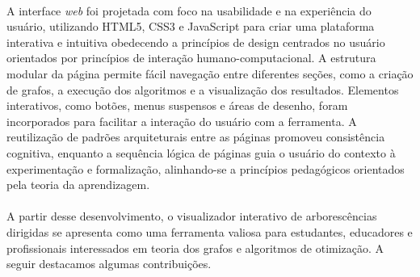 \documentclass[12pt,a4paper]{article}
\begin{document}
\paragraph{}
A interface \textit{web} foi projetada com foco na usabilidade e na experiência do usuário, utilizando HTML5, CSS3 e JavaScript para criar uma plataforma interativa e intuitiva obedecendo a princípios de design centrados no usuário orientados por princípios de interação humano-computacional. A estrutura modular da página permite fácil navegação entre diferentes seções, como a criação de grafos, a execução dos algoritmos e a visualização dos resultados. Elementos interativos, como botões, menus suspensos e áreas de desenho, foram incorporados para facilitar a interação do usuário com a ferramenta. A reutilização de padrões arquiteturais entre as páginas promoveu consistência cognitiva, enquanto a sequência lógica de páginas guia o usuário do contexto à experimentação e formalização, alinhando-se a princípios pedagógicos orientados pela teoria da aprendizagem.

\paragraph{}
A partir desse desenvolvimento, o visualizador interativo de arborescências dirigidas se apresenta como uma ferramenta valiosa para estudantes, educadores e profissionais interessados em teoria dos grafos e algoritmos de otimização. A seguir destacamos algumas contribuições.
\end{document}
